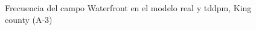 \begin{figure}[H]
    \centering
    
    \caption{Frecuencia del campo Waterfront en el modelo real y tddpm, King county (A-3)}
    \label{frecuency-tddpm-waterfront}
\end{figure}
